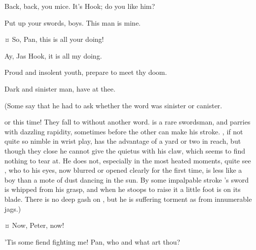 \begin{drama}

\hookspeaks
Back, back, you mice.
It’s Hook; do you like him?

\peterspeaks
Put up your swords, boys.
This man is mine.


\hookspeaks {}¤
So, Pan, this is all your doing!

\peterspeaks
Ay, Jas Hook, it is all my doing.

\hookspeaks
Proud and insolent youth, prepare to meet thy doom.

\peterspeaks
Dark and sinister man, have at thee.

\begin{stagedir}
(Some say that he had to ask \tootles whether the word was sinister or canister.

\hook or \peter this time!
They fall to without another word.
\peter is a rare swordsman, and parries with dazzling rapidity,
sometimes before the other can make his stroke.
\hook, if not quite so nimble in wrist play, has the advantage of a yard or two in reach,
but though they close he cannot give the quietus with his claw, which seems to find nothing to tear at.
He does not, especially in the most heated moments, quite see \peter,
who to his eyes, now blurred or opened clearly for the first time,
is less like a boy than a mote of dust dancing in the sun.
By some impalpable stroke \hook’s sword is whipped from his grasp,
and when he stoops to raise it a little foot is on its blade.
There is no deep gash on \hook, but he is suffering torment as from innumerable jags.)
\end{stagedir}

 ¤
Now, Peter, now!


\hookspeaks
’Tis some fiend fighting me!
Pan, who and what art thou?


\end{drama}

